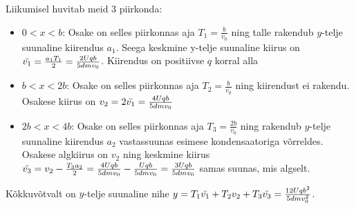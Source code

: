 Liikumisel huvitab meid 3 piirkonda:
\begin{itemize}
    \item $0 < x < b$: Osake on selles piirkonnas aja $T_1 = \frac{b}{v_0}$ ning talle rakendub $y$-telje suunaline kiirendus $a_1$. Seega keskmine y-telje suunaline kiirus on $\Bar{v_1}=\frac{a_1T_1}{2} = \frac{2Uqb}{5dmv_0}$. Kiirendus on positiivse $q$ korral alla
    \item $b<x<2b$: Osake on selles piirkonnas aja $T_2=\frac{b}{v_0}$ ning kiirendust ei rakendu. Osakese kiirus on $v_2 = 2\Bar{v_1} = \frac{4Uqb}{5dmv_0}$
    \item $2b<x<4b$: Osake on selles piirkonnas aja $T_3 = \frac{2b}{v_0}$ ning rakendub $y$-telje suunaline kiirendus $a_2$ vastassuunas esimese kondensaatoriga võrreldes. Osakese algkiirus on $v_2$ ning keskmine kiirus $\Bar{v_3} = v_2 - \frac{T_3a_2}{2} = \frac{4Uqb}{5dmv_0} - \frac{Uqb}{5dmv_0} = \frac{3Uqb}{5dmv_0}$ samas suunas, mis algselt.
\end{itemize}

Kõkkuvõtvalt on $y$-telje suunaline nihe $y = T_1\Bar{v_1} + T_2v_2 + T_3\Bar{v_3} = \frac{12Uqb^2}{5dmv_0^2}$.
\probend